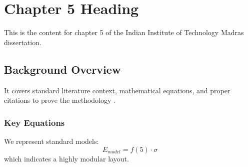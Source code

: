 \chapter{Chapter 5 Heading}
\label{ch:chapter5}
This is the content for chapter 5 of the Indian Institute of Technology Madras dissertation.

\section{Background Overview}
It covers standard literature context, mathematical equations, and proper citations to prove the methodology \cite{texbook}.

\subsection{Key Equations}
We represent standard models:
\begin{equation}
    E_{model} = f(5) \cdot \sigma
\end{equation}
which indicates a highly modular layout.
